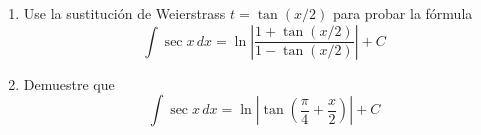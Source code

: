 \item 
    \begin{enumerate}
        \item[(a)] Use la sustitución de Weierstrass $t = \tan(x/2)$ para probar la fórmula
        \[ \int \sec x \, dx = \ln\left| \frac{1 + \tan(x/2)}{1 - \tan(x/2)} \right| + C \]
        \item[(b)] Demuestre que
        \[ \int \sec x \, dx = \ln\left| \tan\left(\frac{\pi}{4} + \frac{x}{2}\right) \right| + C \]
    \end{enumerate}
